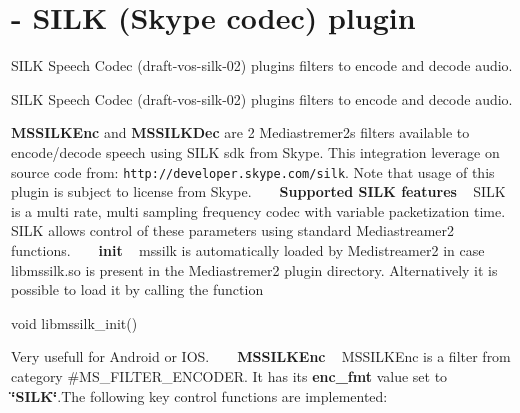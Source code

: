 \section{-\/ S\+I\+LK (Skype codec) plugin}
\label{group__mssilk}


S\+I\+LK Speech Codec (draft-\/vos-\/silk-\/02) plugins filters to encode and decode audio.  


S\+I\+LK Speech Codec (draft-\/vos-\/silk-\/02) plugins filters to encode and decode audio. 

{\bfseries M\+S\+S\+I\+L\+K\+Enc} and {\bfseries M\+S\+S\+I\+L\+K\+Dec} are 2 Mediastremer2\textquotesingle{}s filters available to encode/decode speech using S\+I\+LK sdk from Skype. This integration leverage on source code from\+: {\tt http\+://developer.\+skype.\+com/silk}. Note that usage of this plugin is subject to license from Skype. ~\newline
~\newline
 {\bfseries  Supported S\+I\+LK features} ~\newline
 S\+I\+LK is a multi rate, multi sampling frequency codec with variable packetization time. S\+I\+LK allows control of these parameters using standard Mediastreamer2 functions. ~\newline
~\newline
 {\bfseries  init} ~\newline
 mssilk is automatically loaded by Medistreamer2 in case libmssilk.\+so is present in the Mediastremer2 plugin directory. Alternatively it is possible to load it by calling the function 
\begin{DoxyCode}
\textcolor{keywordtype}{void} libmssilk\_init() 
\end{DoxyCode}
 Very usefull for Android or I\+OS. ~\newline
~\newline
 {\bfseries  M\+S\+S\+I\+L\+K\+Enc} ~\newline
 M\+S\+S\+I\+L\+K\+Enc is a filter from category \#\+M\+S\+\_\+\+F\+I\+L\+T\+E\+R\+\_\+\+E\+N\+C\+O\+D\+ER. It has its {\bfseries enc\+\_\+fmt} value set to {\bfseries \char`\"{}\+S\+I\+L\+K\char`\"{}}.The following key control functions are implemented\+: ~\newline
 
